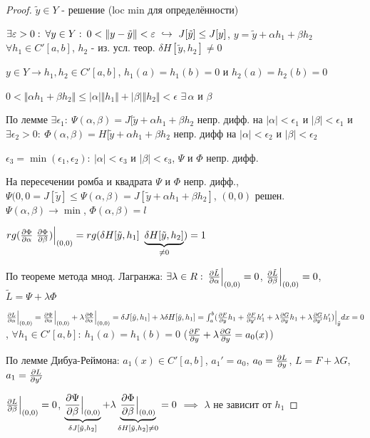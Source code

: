 \documentclass{article}
\begin{document}
\begin{proof}
  $\tilde{y} \in Y$ - решение (loc min для определённости)

  $\exists \epsilon > 0: \: \forall y\in Y: \: 0 < \Vert y -\tilde{y} \Vert < \epsilon \ \true \ J[\tilde{y}] \le J[y]$,
  $y = \tilde{y} + \alpha h_1 + \beta h_2$ $\forall h_1 \in C'[a,b]$, $h_2$ - из. усл. теор. $\delta H[\tilde{y},h_2] \neq 0$

  $y \in Y \rightarrow h_1, h_2 \in C'[a,b]$, $h_1(a)=h_1(b)=0$ и $h_2(a) = h_2(b)=0$ 

  $0 < \Vert \alpha h_1 + \beta h_2 \Vert \le |\alpha| \Vert h_1 \Vert + |\beta|\Vert h_2 \Vert < \epsilon$ $\exists \, \alpha$ и $\beta$

  По лемме $\exists \epsilon_1: \: \Psi(\alpha,\beta)=J[\tilde{y}+\alpha h_1 + \beta h_2$ непр. дифф. на $|\alpha| < \epsilon_1$ и $|\beta| < \epsilon_1$
  и $\exists \epsilon_2 > 0: \: \Phi(\alpha,\beta)=H[\tilde{y}+\alpha h_1 + \beta h_2$
  непр. дифф на $|\alpha| < \epsilon_2$ и $|\beta| < \epsilon_2$

  $\epsilon_3 = \min (\epsilon_1, \epsilon_2): \: |\alpha| < \epsilon_3$ и $|\beta| < \epsilon_3$, $\Psi$ и $\Phi$ непр. дифф. 

  На пересечении ромба и квадрата $\Psi$ и $\Phi$ непр. дифф., $\Psi(0,0=J[\tilde{y}] \le \Psi(\alpha,\beta)=J[\tilde{y}+\alpha h_1 +\beta h_2]$,
  $(0,0)$ решен. $\Psi(\alpha,\beta) \to \min$, $\Phi(\alpha,\beta)=l$

  $rg(\pd{\Phi}{\alpha} \ \pd{\Phi}{\beta})\Big|_{(0,0)}=rg(\delta H[\tilde{y},h_1] \ \underbrace{\delta H[\tilde{y}, h_2]}_{\neq 0})=1$

  По теореме метода мнод. Лагранжа: $\exists \lambda \in R: \: \frac{\partial{\tilde{L}}}{\partial{\alpha}}\Big|_{(0,0)}=0$, $\frac{\partial{\tilde{L}}}{\partial{\beta}}\Big|_{(0,0)}=0$, $\tilde{L}=\Psi+\lambda \Phi$

  $\frac{\partial{L}}{\partial{\alpha}}\Big|_{(0,0)}=\frac{\partial{\Psi}}{\partial{\alpha}}\Big|_{(0,0)} + \lambda \frac{\partial{\Phi}}{\partial{\alpha}}\Big|_{(0,0)}=\delta J[\tilde{y}, h_1]+\lambda \delta H[\tilde{y},h_1]
  =\int_{a}^{b}(\frac{\partial{F}}{\partial{y}}h_1 + \frac{\partial{F}}{\partial{y'}}h_1'+\lambda \frac{\partial{G}}{\partial{y}}h_1 + \lambda \frac{\partial{G}}{\partial{y'}}h_1')\Big|_{\tilde{y}}dx=0$,
  $\forall h_1 \in C'[a,b]: \: h_1(a)=h_1(b)=0$ ($\frac{\partial{F}}{\partial{y}}+\lambda \frac{\partial{G}}{\partial{y}}=a_0(x)$)

  По лемме Дибуа-Реймона: $a_1(x) \in C'[a,b]$, $a_1'=a_0$, $a_0=\frac{\partial{L}}{\partial{y}}$, $L=F+\lambda G$, $a_1 = \frac{\partial{L}}{\partial{y'}}$

  $\frac{\partial{L}}{\partial{\beta}}\Big|_{(0,0)}=0$, $\underbrace{\frac{\partial{\Psi}}{\partial{\beta}}\Big|_{(0,0)}}_{\delta J[\tilde{y},h_2]}+\lambda \underbrace{\frac{\partial{\Phi}}{\partial{\beta}}\Big|_{(0,0)}}_{\delta H[\tilde{y},h_2]\neq0}=0$
  $\implies$ $\lambda $ не зависит от $h_1$

\end{proof}
\end{document}
